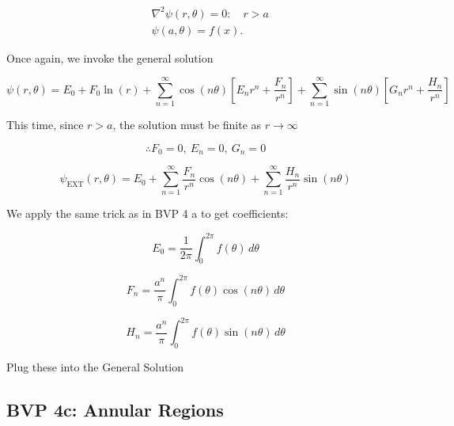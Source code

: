 \documentclass{report}
\begin{document}
$$
\begin{aligned}
& \nabla^{2} \psi(r, \theta)=0: \quad r>a \\
& \psi(a, \theta)=f(x).
\end{aligned}
$$

Once again, we invoke the general solution

$$
\psi(r, \theta)=E_{0}+F_{0} \ln (r)+\sum\limits_{n=1}^{\infty} \cos (n \theta)\left[E_{n} r^{n}+\dfrac{F_{n}}{r^{n}}\right]+\sum\limits_{n=1}^{\infty} \sin (n \theta)\left[G_{n} r^{n}+\dfrac{H_{n}}{r^{n}}\right]
$$

This time, since $r>a$, the solution must be finite as $r \rightarrow \infty$

$$
\therefore F_{0}=0,\ E_{n}=0,\ G_{n}=0
$$

\[
\boxed{
\psi_{\text{EXT}}(r, \theta)=E_{0}+\sum_{n=1}^{\infty}\frac{F_{n}}{r^{n}}\cos(n\theta)+\sum_{n=1}^{\infty}\frac{H_{n}}{r^{n}}\sin(n\theta)
}
\]

We apply the same trick as in BVP 4 a to get coefficients:

\[
\boxed{ E_{0} = \frac{1}{2\pi} \int_{0}^{2\pi} f(\theta)\, d\theta }
\]

\[
\boxed{ F_{n} = \frac{a^{n}}{\pi} \int_{0}^{2\pi} f(\theta)\cos(n\theta)\, d\theta }
\]

\[
\boxed{ H_{n} = \frac{a^{n}}{\pi} \int_{0}^{2\pi} f(\theta)\sin(n\theta)\, d\theta }
\]

Plug these into the General Solution

\subsection{BVP 4c: Annular Regions}
\end{document}
